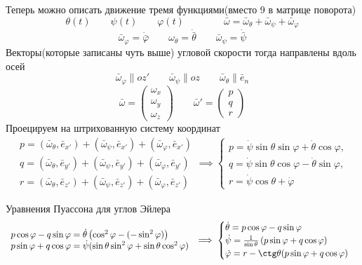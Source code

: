 \documentclass[crop=false]{standalone}
\begin{document}
\noindent \keypoint
Теперь можно описать движение тремя функциями(вместо 9 в матрице поворота)
\[\theta(t) \qquad \psi(t) \qquad \varphi(t) \qquad \qquad \bar \omega = \bar \omega_\theta + \bar \omega_\psi + \bar \omega_\varphi\]
\[\bar \omega_\varphi = \dot {\bar \varphi} \qquad \omega_\theta = \dot {\bar \theta} \qquad \bar \omega_\psi = \dot {\bar \psi}\]
Векторы(которые записаны чуть выше) угловой скорости тогда направлены вдоль осей 
\[\bar \omega_\varphi \| oz' \qquad \bar \omega_\psi \| oz \qquad \bar \omega_\theta \| \bar e_n\]
\[\bar \omega = \begin{pmatrix}
    \omega_x \\ \omega_y \\ \omega_z 
\end{pmatrix}
\qquad
\bar \omega' = 
\begin{pmatrix}
    p \\ q \\ r
\end{pmatrix}
\]
Проецируем на штрихованную систему координат
\[
\begin{array}{l}
    p = (\bar \omega_\theta , \bar e_{x'}) + (\bar \omega_\psi, \bar e_{x'}) + (\bar \omega_\varphi, \bar e_{x'})\\ 
    q = (\bar \omega_\theta, \bar e_{y'}) + (\bar \omega_\psi, \bar e_{y'}) + (\bar \omega_\varphi, \bar e_{y'})\\
    r = (\bar \omega_\theta, \bar e_{z'}) + (\bar \omega_\psi , \bar e_{z'}) + (\bar \omega_\varphi, \bar e_{z'}) 
\end{array}
\implies
\begin{cases}
 p = \dot \psi \sin \theta \sin \varphi + \dot \theta \cos \varphi, \\
 q = \dot \psi \sin \theta \cos \varphi - \dot \theta \sin \varphi , \\
 r = \dot \psi \cos \theta + \dot \varphi
\end{cases}
\]

\noindent \keypoint 
Уравнения Пуассона для углов Эйлера 
\[
\begin{array}{l}
p\cos \varphi - q \sin \varphi = \dot \theta \left( \cos ^2 \varphi - (- \sin^2 \varphi)\right) \\
p \sin \varphi + q \cos \varphi = \dot \psi (\sin \theta \sin ^2 \varphi + \sin \theta \cos^2\varphi)  \\
\end{array} \implies 
\begin{cases}
    \dot \theta = p \cos \varphi - q \sin \varphi  \\
    \dot \psi = \frac{1}{\sin \theta} \left( p \sin \varphi + q \cos \varphi \right) \\
    \dot \varphi = r - \ctg \theta (p \sin \varphi + q \cos \varphi)
\end{cases}
\]
\end{document}
